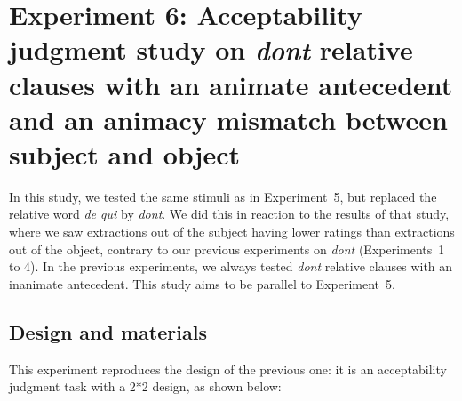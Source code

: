 \section[head=Experiment 6]{Experiment 6: Acceptability judgment study on \emph{dont} relative clauses with an animate antecedent and an animacy mismatch between subject and object}

In this study, we tested the same stimuli as in Experiment~5, but replaced the relative word \emph{de qui} by \emph{dont}. We did this in reaction to the results of that study, where we saw extractions out of the subject having lower ratings than extractions out of the object, contrary to our previous experiments on \emph{dont} (Experiments~1 to 4). In the previous experiments, we always tested \emph{dont} relative clauses with an inanimate antecedent. This study aims to be parallel to Experiment~5.

\subsection{Design and materials}

This experiment reproduces the design of the previous one: it is an acceptability judgment task with a 2*2 design, as shown below:
\pagebreak

\eal 
{}
\label{ex:exp06-subj-pp}
\label{ex:exp06-obj-pp}
\zl 

\eal \label{ex:exp06-no}
\label{ex:exp06-subj-no}
\label{ex:exp06-obj-no}
\zl 

